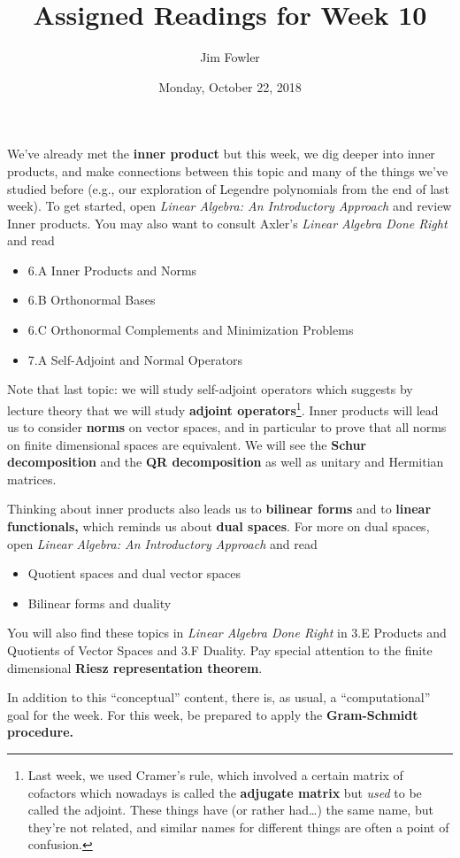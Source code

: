 \documentclass{homework}
\author{Jim Fowler}
\title{Assigned Readings for Week 10}
\date{Monday, October 22, 2018}
\begin{document}
\maketitle

We've already met the \textbf{inner product} but this week, we dig
deeper into inner products, and make connections between this topic
and many of the things we've studied before (e.g., our exploration of
Legendre polynomials from the end of last week). To get started, open
\textit{Linear Algebra: An Introductory Approach} and review
 Inner products.  You may also want to consult Axler's
\textit{Linear Algebra Done Right} and read
\begin{itemize}
\item \textsection 6.A Inner Products and Norms
\item \textsection 6.B Orthonormal Bases
\item \textsection 6.C Orthonormal Complements and Minimization Problems
\item \textsection 7.A Self-Adjoint and Normal Operators
\end{itemize}
Note that last topic: we will study self-adjoint operators which
suggests by lecture theory that we will study \textbf{adjoint
  operators}\footnote{Last week, we used Cramer's rule, which involved a
certain matrix of cofactors which nowadays is called the
\textbf{adjugate matrix} but \textit{used} to be called the adjoint.
These things have (or rather had\ldots) the same name, but they're not
related, and similar names for different things are often a point of
confusion.}.  Inner products will lead us to consider \textbf{norms} on vector
spaces, and in particular to prove that all norms on finite
dimensional spaces are equivalent.  We will see the \textbf{Schur decomposition} and the \textbf{QR decomposition} as well as unitary and Hermitian matrices.

Thinking about inner products also leads us to \textbf{bilinear forms}
and to \textbf{linear functionals,} which  reminds us about
\textbf{dual spaces}.  For more on dual spaces, open \textit{Linear
  Algebra: An Introductory Approach} and read
\begin{itemize}
\item {} Quotient spaces and dual vector spaces
\item {} Bilinear forms and duality
\end{itemize}
You will also find these topics in \textit{Linear Algebra Done Right}
in \textsection 3.E Products and Quotients of Vector Spaces and
\textsection 3.F Duality.  Pay special attention to the finite dimensional \textbf{Riesz representation theorem}.

In addition to this ``conceptual'' content, there is, as usual, a
``computational'' goal for the week.  For this week, be prepared to
apply the \textbf{Gram-Schmidt procedure.}
\end{document}
